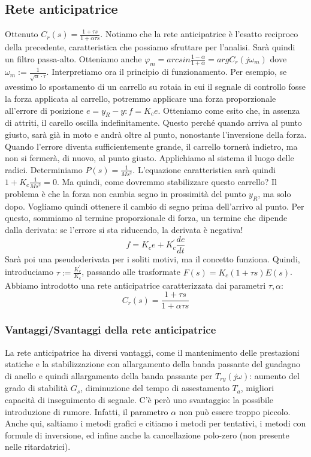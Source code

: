 \documentclass[11pt]{article}
\begin{document}
\subsection{Rete anticipatrice}
Ottenuto $C_r(s)=\frac{1+\tau s}{1+\alpha \tau s}$. Notiamo che la rete anticipatrice è l'esatto reciproco della precedente, caratteristica che possiamo sfruttare per l'analisi. Sarà quindi un filtro passa-alto. Otteniamo anche $\varphi_m = arcsin\frac{1-\alpha}{1+\alpha}=argC_r(j\omega_m)$ dove $\omega_m := \frac{1}{\sqrt{\alpha}\cdot \tau}$.
Interpretiamo ora il principio di funzionamento. Per esempio, se avessimo lo spostamento di un carrello su rotaia in cui il segnale di controllo fosse la forza applicata al carrello, potremmo applicare una forza proporzionale all'errore di posizione $e=y_R -y : f=K_ce$. Otteniamo come esito che, in assenza di attriti, il carello oscilla indefinitamente. Questo perché quando arriva al punto giusto, sarà già in moto e andrà oltre al punto, nonostante l'inversione della forza. Quando l'errore diventa sufficientemente grande, il carrello tornerà indietro, ma non si fermerà, di nuovo, al punto giusto.
Applichiamo al sistema il luogo delle radici. Determiniamo $P(s)=\frac{1}{Ms^2}$. L'equazione caratteristica sarà quindi $1+K_c \frac{1}{Ms^2}=0$. Ma quindi, come dovremmo stabilizzare questo carrello? Il problema è che la forza non cambia segno in prossimità del punto $y_R$, ma solo dopo. Vogliamo quindi ottenere il cambio di segno prima dell'arrivo al punto. Per questo, sommiamo al termine proporzionale di forza, un termine che dipende dalla derivata: se l'errore si sta riducendo, la derivata è negativa!
\begin{displaymath}
    f=K_ce+K_c^{'}\frac{de}{dt}
\end{displaymath}
Sarà poi una pseudoderivata per i soliti motivi, ma il concetto funziona. Quindi, introduciamo $\tau:=\frac{K_c^{'}}{K_c}$, passando alle trasformate $F(s)=K_c(1+\tau s)E(s)$. Abbiamo introdotto una rete anticipatrice caratterizzata dai parametri $\tau, \alpha$:
\begin{displaymath}
    C_r(s)=\frac{1+\tau s}{1+\alpha\tau s}
\end{displaymath}
\subsubsection{Vantaggi/Svantaggi della rete anticipatrice}
La rete anticipatrice ha diversi vantaggi, come il mantenimento delle prestazioni statiche e la stabilizzazione con allargamento della banda passante del guadagno di anello e quindi allargamento della banda passante per $T_{ry}(j\omega)$: aumento del grado di stabilità $G_s$, diminuzione del tempo di assestamento $T_a$, migliori capacità di inseguimento di segnale. C'è però uno svantaggio: la possibile introduzione di rumore. Infatti, il parametro $\alpha$ non può essere troppo piccolo. Anche qui, saltiamo i metodi grafici e citiamo i metodi per tentativi, i metodi con formule di inversione, ed infine anche la cancellazione polo-zero (non presente nelle ritardatrici).
\end{document}
